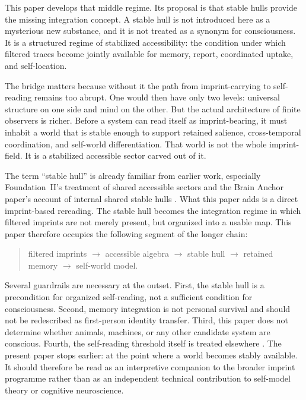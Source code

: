 \documentclass[12pt]{article}
\begin{document}
This paper develops that middle regime. Its proposal is that stable hulls provide the missing integration concept. A stable hull is not introduced here as a mysterious new substance, and it is not treated as a synonym for consciousness. It is a structured regime of stabilized accessibility: the condition under which filtered traces become jointly available for memory, report, coordinated uptake, and self-location.

The bridge matters because without it the path from imprint-carrying to self-reading remains too abrupt. One would then have only two levels: universal structure on one side and mind on the other. But the actual architecture of finite observers is richer. Before a system can read itself as imprint-bearing, it must inhabit a world that is stable enough to support retained salience, cross-temporal coordination, and self-world differentiation. That world is not the whole imprint-field. It is a stabilized accessible sector carved out of it.

The term ``stable hull'' is already familiar from earlier work, especially Foundation~II's treatment of shared accessible sectors and the Brain Anchor paper's account of internal shared stable hulls \cite{FoundationII,BrainAnchor}. What this paper adds is a direct imprint-based rereading. The stable hull becomes the integration regime in which filtered imprints are not merely present, but organized into a usable map. This paper therefore occupies the following segment of the longer chain:

\begin{quote}
filtered imprints $\to$ accessible algebra $\to$ stable hull $\to$ retained memory $\to$ self-world model.
\end{quote}

Several guardrails are necessary at the outset. First, the stable hull is a precondition for organized self-reading, not a sufficient condition for consciousness. Second, memory integration is not personal survival and should not be redescribed as first-person identity transfer. Third, this paper does not determine whether animals, machines, or any other candidate system are conscious. Fourth, the self-reading threshold itself is treated elsewhere \cite{WorldImprint}. The present paper stops earlier: at the point where a world becomes stably available. It should therefore be read as an interpretive companion to the broader imprint programme rather than as an independent technical contribution to self-model theory or cognitive neuroscience.
\end{document}
